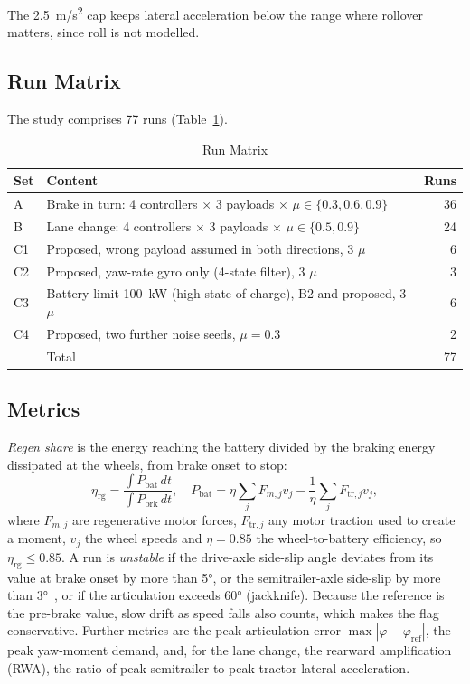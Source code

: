 \documentclass[conference]{IEEEtran}
\newcommand{\regen}{\ensuremath{\eta_{\mathrm{rg}}}}
\begin{document}
The \SI{2.5}{m/s^2} cap keeps lateral acceleration below the range where rollover matters, since roll is not modelled.

\subsection{Run Matrix}
The study comprises 77 runs (Table~\ref{tab:runs}).

\begin{table}[t]
\caption{Run Matrix}
\label{tab:runs}
\centering
\begin{tabular}{@{}lp{5.3cm}r@{}}
\toprule
Set & Content & Runs\\
\midrule
A & Brake in turn: 4 controllers $\times$ 3 payloads $\times$ $\mu\in\{0.3,0.6,0.9\}$ & 36\\
B & Lane change: 4 controllers $\times$ 3 payloads $\times$ $\mu\in\{0.5,0.9\}$ & 24\\
C1 & Proposed, wrong payload assumed in both directions, 3 $\mu$ & 6\\
C2 & Proposed, yaw-rate gyro only (4-state filter), 3 $\mu$ & 3\\
C3 & Battery limit \SI{100}{kW} (high state of charge), B2 and proposed, 3 $\mu$ & 6\\
C4 & Proposed, two further noise seeds, $\mu=0.3$ & 2\\
\midrule
 & Total & 77\\
\bottomrule
\end{tabular}
\end{table}

\subsection{Metrics}
\emph{Regen share} is the energy reaching the battery divided by the braking energy dissipated at the wheels, from brake onset to stop:
\begin{equation}
\regen=\frac{\int P_{\mathrm{bat}}\,dt}{\int P_{\mathrm{brk}}\,dt},\quad
P_{\mathrm{bat}}=\eta\sum_j F_{m,j}v_j-\frac1\eta\sum_j F_{\mathrm{tr},j}v_j,
\end{equation}
where $F_{m,j}$ are regenerative motor forces, $F_{\mathrm{tr},j}$ any motor traction used to create a moment, $v_j$ the wheel speeds and $\eta=0.85$ the wheel-to-battery efficiency, so $\regen\le0.85$.
A run is \emph{unstable} if the drive-axle side-slip angle deviates from its value at brake onset by more than \ang{5}, or the semitrailer-axle side-slip by more than \ang{3}~\cite{erdinc2023}, or if the articulation exceeds \ang{60} (jackknife). Because the reference is the pre-brake value, slow drift as speed falls also counts, which makes the flag conservative. Further metrics are the peak articulation error $\max|\varphi-\varphi_{\mathrm{ref}}|$, the peak yaw-moment demand, and, for the lane change, the rearward amplification (RWA), the ratio of peak semitrailer to peak tractor lateral acceleration.
\end{document}
